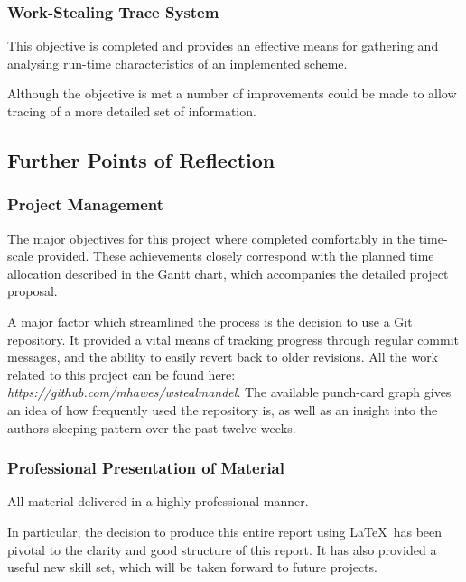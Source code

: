 \subsubsection*{Work-Stealing Trace System}
    This objective is completed and provides an effective means for gathering 
    and analysing run-time characteristics of an implemented scheme.
    
    Although the objective is met a number of improvements could be made to allow tracing of 
    a more detailed set of information. 

\subsection*{Further Points of Reflection}
\subsubsection*{Project Management}
    The major objectives for this project where completed comfortably in the time-scale provided.
    These achievements closely correspond with the planned time allocation described in the Gantt chart,
    which accompanies the detailed project proposal.
    
    A major factor which streamlined the process is the decision to use a Git repository.
    It provided a vital means of tracking progress through regular commit messages, and the ability
    to easily revert back to older revisions. All the work related to this project can be found 
    here: \textit{https://github.com/mhawes/wstealmandel}.
    The available punch-card graph gives an idea of how frequently used the repository is, as well
    as an insight into the authors sleeping pattern over the past twelve weeks.

\subsubsection*{Professional Presentation of Material}
    All material delivered in a highly professional manner.
    
    In particular, the decision to produce this entire report using \LaTeX~has been pivotal
    to the clarity and good structure of this report. It has also provided a useful new skill set, 
    which will be taken forward to future projects.

